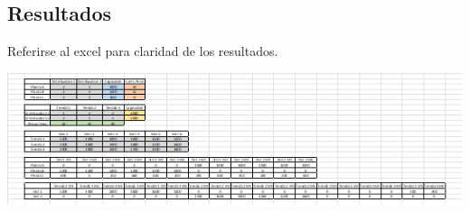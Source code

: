 \documentclass[12pt]{article}
\begin{document}
\vspace{3cm}

\subsection*{Resultados}
\noindent Referirse al excel para claridad de los resultados.
\begin{center}
  \includegraphics[width=\linewidth]{assets/resultados.png}
\end{center}
\end{document}
